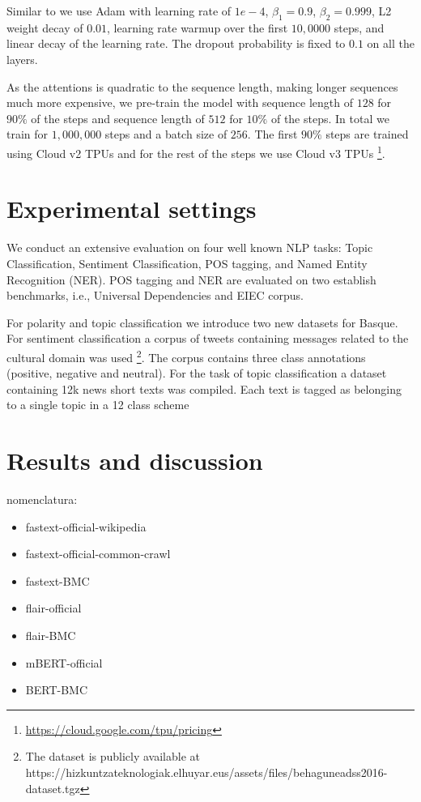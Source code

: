 \documentclass[10pt, a4paper]{article}
\begin{document}
Similar to \cite{devlin2019bert} we use Adam with learning rate of $1e-4$, $\beta_1=0.9$, $\beta_2=0.999$, L2 weight decay of $0.01$, learning rate warmup over the first $10,0000$ steps, and linear decay of the learning rate. The dropout probability is fixed to $0.1$ on all the layers. 

As the attentions is quadratic to the sequence length, making longer sequences much more expensive, we pre-train the model with sequence length of $128$ for $90\%$ of the steps and sequence length of $512$ for $10\%$ of the steps. In total we train for $1,000,000$ steps and a batch size of $256$. The first $90\%$ steps are trained using Cloud v2 TPUs and for the rest of the steps we use Cloud v3 TPUs \footnote{\url{https://cloud.google.com/tpu/pricing}}. 

\section{Experimental settings}\label{sec:exper-sett}

We conduct an extensive evaluation on four well known NLP tasks: Topic Classification, Sentiment Classification, POS tagging, and Named Entity Recognition (NER). POS tagging and NER are evaluated on two establish benchmarks, i.e., Universal Dependencies and EIEC corpus. 

For polarity and topic classification we introduce two new datasets for Basque. For sentiment classification a corpus of tweets containing messages related to the cultural domain was used \cite{san2019multilingual}\footnote{The dataset is publicly available at https://hizkuntzateknologiak.elhuyar.eus/assets/files/behaguneadss2016-dataset.tgz}. The corpus contains three class annotations (positive, negative and neutral). For the task of topic classification a dataset containing 12k news short texts was compiled. Each text is tagged as belonging to a single topic in a 12 class scheme



\section{Results and discussion}\label{sec:results-discussion}

nomenclatura: \begin{itemize}
    \item fastext-official-wikipedia 
    \item fastext-official-common-crawl 
    \item fastext-BMC
    \item flair-official
    \item flair-BMC
    \item mBERT-official
    \item BERT-BMC
\end{itemize}
\end{document}
